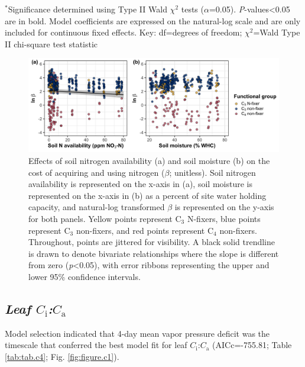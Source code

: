 \begin{singlespace}
    \noindent $^*$Significance determined using Type II Wald $\chi^{2}$ tests ($\alpha$=0.05). \textit{P}-values<0.05 are in bold. Model coefficients are expressed on the natural-log scale and are only included for continuous fixed effects. Key: df=degrees of freedom; $\chi^2$=Wald Type II chi-square test statistic
\end{singlespace}
\clearpage

\newpage
\begin{landscape}
    \begin{figure}
    \centering
    \includegraphics[scale = 0.075]{ch4_TXeco/figs/TXeco_fig2_beta.png}
    \caption[Effects of soil nitrogen availability and soil moisture on the cost of acquiring and using nitrogen]{Effects of soil nitrogen availability (a) and soil moisture (b) on the cost of acquiring and using nitrogen ($\beta$; unitless). Soil nitrogen availability is represented on the x-axis in (a), soil moisture is represented on the x-axis in (b) as a percent of site water holding capacity, and natural-log transformed $\beta$ is represented on the y-axis for both panels. Yellow points represent C$_3$ N-fixers, blue points represent C$_3$ non-fixers, and red points represent C$_4$ non-fixers. Throughout, points are jittered for visibility. A black solid trendline is drawn to denote bivariate relationships where the slope is different from zero (\textit{p}<0.05), with error ribbons representing the upper and lower 95\% confidence intervals.}
    \label{fig:figure4.2}
\end{figure}
\end{landscape}
\clearpage

\subsection{\textit{Leaf $C_\mathrm{i}$:$C_\mathrm{a}$}}
\noindent Model selection indicated that 4-day mean vapor pressure deficit was the timescale that conferred the best model fit for leaf $C_\mathrm{i}$:$C_\mathrm{a}$ (AICc=-755.81; Table \ref{tab:tab.c4}; Fig. \ref{fig:figure.c1}).

